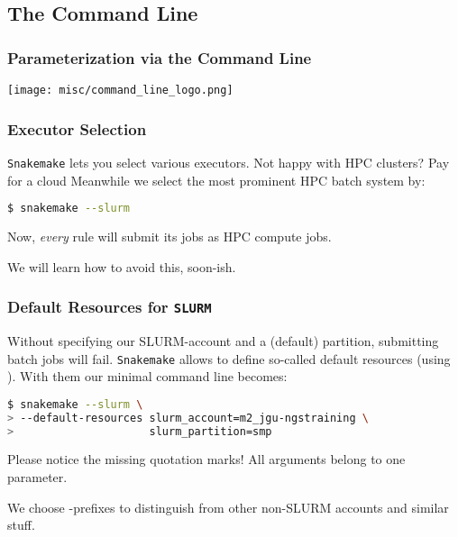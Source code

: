 \subsection{The Command Line}

\begin{frame}
  \frametitle{Parameterization via the Command Line}
  \centering
  \texttt{[image: misc/command\_line\_logo.png]}
\end{frame}

\begin{frame}[fragile]
  \frametitle{Executor Selection}
  \texttt{Snakemake} lets you select various executors. Not happy with HPC clusters? Pay for a cloud  \newline
  Meanwhile we select the most prominent HPC batch system by:
  \begin{lstlisting}[language=Bash, style=Shell]
$ snakemake --slurm
  \end{lstlisting}
  Now, \emph{every} rule will submit its jobs as HPC compute jobs.
  \begin{hint}
  	We will learn how to avoid this, soon-ish.
  \end{hint}
\end{frame}

\begin{frame}[fragile]
  \frametitle{Default Resources for \texttt{SLURM}}
  Without specifying our SLURM-account and a (default) partition, submitting batch jobs will fail. \texttt{Snakemake} allows to define so-called default resources (using ). With them our minimal command line becomes:
  \begin{lstlisting}[language=Bash, style=Shell, basicstyle=\footnotesize]
$ snakemake --slurm \
> --default-resources slurm_account=m2_jgu-ngstraining \
>                     slurm_partition=smp
  \end{lstlisting}
  \begin{hint}
  	Please notice the missing quotation marks! All arguments belong to one parameter.
  \end{hint}
  \begin{docs}
  	We choose -prefixes to distinguish from other non-SLURM accounts and similar stuff.
  \end{docs}
\end{frame}

